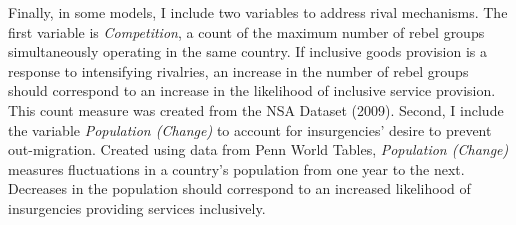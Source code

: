 \documentclass[12pt, letterpaper]{article}
\begin{document}
Finally, in some models, I include two variables to address rival mechanisms. The first variable is \textit{Competition}, a count of the maximum number of rebel groups simultaneously operating in the same country. If inclusive goods provision is a response to intensifying rivalries, an increase in the number of rebel groups should correspond to an increase in the likelihood of inclusive service provision. This count measure was created from the NSA Dataset (2009). Second, I include the variable \textit{Population (Change)} to account for insurgencies' desire to prevent out-migration. Created using data from Penn World Tables, \textit{Population (Change)} measures fluctuations in a country's population from one year to the next. Decreases in the population should correspond to an increased likelihood of insurgencies providing services inclusively.

\end{document}
